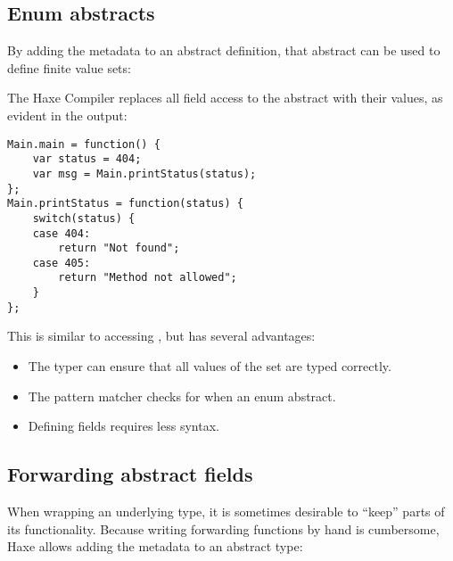 

\subsection{Enum abstracts}
\label{types-abstract-enum}

By adding the  metadata to an abstract definition, that abstract can be used to define finite value sets:


The Haxe Compiler replaces all field access to the  abstract with their values, as evident in the  output:

\begin{lstlisting}
Main.main = function() {
	var status = 404;
	var msg = Main.printStatus(status);
};
Main.printStatus = function(status) {
	switch(status) {
	case 404:
		return "Not found";
	case 405:
		return "Method not allowed";
	}
};
\end{lstlisting}

This is similar to accessing , but has several advantages:

\begin{itemize}
	\item The typer can ensure that all values of the set are typed correctly.
	\item The pattern matcher checks for  when  an enum abstract.
	\item Defining fields requires less syntax.
\end{itemize}


\subsection{Forwarding abstract fields}
\label{types-abstract-forward}

When wrapping an underlying type, it is sometimes desirable to ``keep'' parts of its functionality. Because writing forwarding functions by hand is cumbersome, Haxe allows adding the  metadata to an abstract type:

